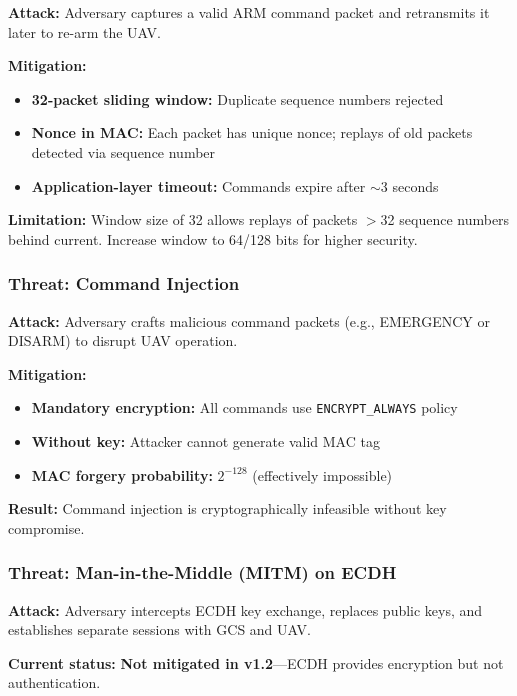 \documentclass[11pt,a4paper]{article}
\begin{document}
\textbf{Attack:} Adversary captures a valid ARM command packet and retransmits it later to re-arm the UAV.

\textbf{Mitigation:}
\begin{itemize}[noitemsep]
    \item \textbf{32-packet sliding window:} Duplicate sequence numbers rejected
    \item \textbf{Nonce in MAC:} Each packet has unique nonce; replays of old packets detected via sequence number
    \item \textbf{Application-layer timeout:} Commands expire after $\sim$3 seconds
\end{itemize}

\textbf{Limitation:} Window size of 32 allows replays of packets $>$32 sequence numbers behind current. Increase window to 64/128 bits for higher security.

\subsubsection{Threat: Command Injection}

\textbf{Attack:} Adversary crafts malicious command packets (e.g., EMERGENCY or DISARM) to disrupt UAV operation.

\textbf{Mitigation:}
\begin{itemize}[noitemsep]
    \item \textbf{Mandatory encryption:} All commands use \texttt{ENCRYPT\_ALWAYS} policy
    \item \textbf{Without key:} Attacker cannot generate valid MAC tag
    \item \textbf{MAC forgery probability:} $2^{-128}$ (effectively impossible)
\end{itemize}

\textbf{Result:} Command injection is cryptographically infeasible without key compromise.

\subsubsection{Threat: Man-in-the-Middle (MITM) on ECDH}

\textbf{Attack:} Adversary intercepts ECDH key exchange, replaces public keys, and establishes separate sessions with GCS and UAV.

\textbf{Current status:} \textcolor{alertred}{\textbf{Not mitigated in v1.2}}---ECDH provides encryption but not authentication.
\end{document}
